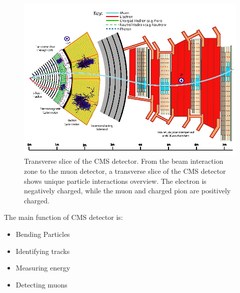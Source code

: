 \begin{figure}[H]
    \centering
    \includegraphics[scale=0.4]{Detector/Figure_001.png}
    \caption{
    Transverse slice of the CMS detector. From the beam interaction zone to the muon detector, a transverse slice of the CMS detector shows unique particle interactions overview. The electron is negatively charged, while the muon and charged pion are positively charged.\cite{CMS_3}}
    \label{fig:my_label_CMS}
\end{figure}

The main function of CMS detector is:
\begin{itemize}
    \item Bending Particles
    \item Identifying tracks
    \item Measuring energy
    \item Detecting muons
\end{itemize}





